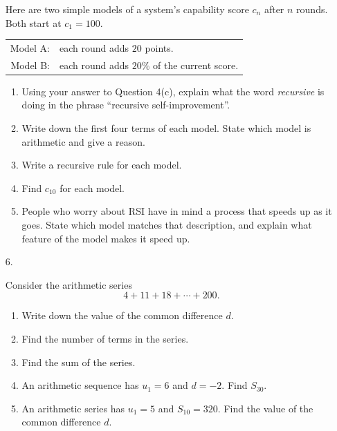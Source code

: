 \documentclass[12pt, twoside]{article}
\begin{document}
\begin{enumerate}[itemsep=0.15cm]
Here are two simple models of a system's capability score $c_{n}$ after
$n$ rounds. Both start at $c_{1} = 100$.

\begin{center}
\begin{tabular}{rl}
Model A: & each round adds $20$ points. \\[2pt]
Model B: & each round adds $20\%$ of the current score. \\
\end{tabular}
\end{center}

\begin{enumerate}[itemsep=0.1cm]
  \item Using your answer to Question 4(c), explain what the word
  \emph{recursive} is doing in the phrase ``recursive self-improvement''.
  \item Write down the first four terms of each model. State which model is
  arithmetic and give a reason.
  \item Write a recursive rule for each model.
  \item Find $c_{10}$ for each model.
  \item People who worry about RSI have in mind a process that speeds up as
  it goes. State which model matches that description, and explain what
  feature of the model makes it speed up.
\end{enumerate}


\newpage

\item[6.]

Consider the arithmetic series
$$4 + 11 + 18 + \cdots + 200.$$

\begin{enumerate}[itemsep=0.1cm]
  \item Write down the value of the common difference $d$.
  \item Find the number of terms in the series.
  \item Find the sum of the series.
  \item An arithmetic sequence has $u_{1} = 6$ and $d = -2$. Find $S_{30}$.
  \item An arithmetic series has $u_{1} = 5$ and $S_{10} = 320$. Find the
  value of the common difference $d$.
\end{enumerate}


\end{enumerate}
\end{document}
